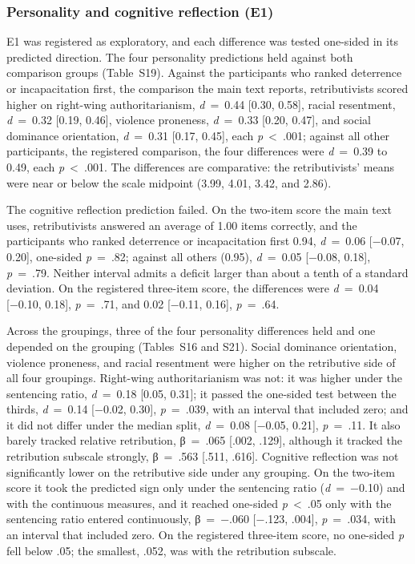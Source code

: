 \subsubsection{Personality and cognitive reflection (E1)}\label{personality-and-cognitive-reflection-e1}

E1 was registered as exploratory, and each difference was tested one-sided in its predicted direction. The four personality predictions held against both comparison groups (Table~S19). Against the participants who ranked deterrence or incapacitation first, the comparison the main text reports, retributivists scored higher on right-wing authoritarianism, \emph{d}~=~0.44 {[}0.30, 0.58{]}, racial resentment, \emph{d}~=~0.32 {[}0.19, 0.46{]}, violence proneness, \emph{d}~=~0.33 {[}0.20, 0.47{]}, and social dominance orientation, \emph{d}~=~0.31 {[}0.17, 0.45{]}, each \emph{p}~\textless{}~.001; against all other participants, the registered comparison, the four differences were \emph{d}~=~0.39 to 0.49, each \emph{p}~\textless{}~.001. The differences are comparative: the retributivists' means were near or below the scale midpoint (3.99, 4.01, 3.42, and 2.86).

The cognitive reflection prediction failed. On the two-item score the main text uses, retributivists answered an average of 1.00 items correctly, and the participants who ranked deterrence or incapacitation first 0.94, \emph{d}~=~0.06 {[}−0.07, 0.20{]}, one-sided \emph{p}~=~.82; against all others (0.95), \emph{d}~=~0.05 {[}−0.08, 0.18{]}, \emph{p}~=~.79. Neither interval admits a deficit larger than about a tenth of a standard deviation. On the registered three-item score, the differences were \emph{d}~=~0.04 {[}−0.10, 0.18{]}, \emph{p}~=~.71, and 0.02 {[}−0.11, 0.16{]}, \emph{p}~=~.64.

Across the groupings, three of the four personality differences held and one depended on the grouping (Tables~S16 and S21). Social dominance orientation, violence proneness, and racial resentment were higher on the retributive side of all four groupings. Right-wing authoritarianism was not: it was higher under the sentencing ratio, \emph{d}~=~0.18 {[}0.05, 0.31{]}; it passed the one-sided test between the thirds, \emph{d}~=~0.14 {[}−0.02, 0.30{]}, \emph{p}~=~.039, with an interval that included zero; and it did not differ under the median split, \emph{d}~=~0.08 {[}−0.05, 0.21{]}, \emph{p}~=~.11. It also barely tracked relative retribution, β~=~.065 {[}.002, .129{]}, although it tracked the retribution subscale strongly, β~=~.563 {[}.511, .616{]}. Cognitive reflection was not significantly lower on the retributive side under any grouping. On the two-item score it took the predicted sign only under the sentencing ratio (\emph{d}~=~−0.10) and with the continuous measures, and it reached one-sided \emph{p}~\textless{}~.05 only with the sentencing ratio entered continuously, β~=~−.060 {[}−.123, .004{]}, \emph{p}~=~.034, with an interval that included zero. On the registered three-item score, no one-sided \emph{p} fell below .05; the smallest, .052, was with the retribution subscale.

